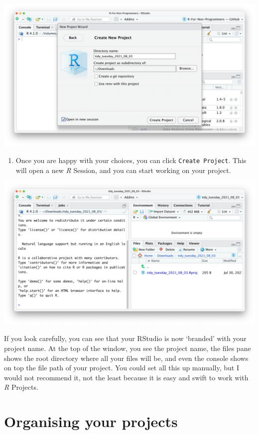 \documentclass[
  letterpaper,
]{krantz}
\providecommand{\tightlist}{%
  \setlength{\itemsep}{0pt}\setlength{\parskip}{0pt}}\usepackage{longtable,booktabs,array}
\begin{document}
\includegraphics{images/chapter_06_img/00_r_project/04_r_project_directory_name.png}

\begin{enumerate}
\def\labelenumi{\arabic{enumi}.}
\setcounter{enumi}{6}
\tightlist
\item
  Once you are happy with your choices, you can click
  \texttt{Create\ Project}. This will open a new \emph{R} Session, and
  you can start working on your project.
\end{enumerate}

\includegraphics{images/chapter_06_img/00_r_project/05_r_project_new_session.png}

If you look carefully, you can see that your RStudio is now `branded'
with your project name. At the top of the window, you see the project
name, the files pane shows the root directory where all your files will
be, and even the console shows on top the file path of your project. You
could set all this up manually, but I would not recommend it, not the
least because it is easy and swift to work with \emph{R} Projects.

\section{Organising your projects}\label{sec-organising-your-projects}
\end{document}
